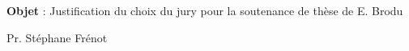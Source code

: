 \documentclass[11pt]{letter}
\begin{document}
\begin{letter}{\textbf{Objet} : Justification du choix du jury pour la soutenance de thèse de E. Brodu}
\parbox{\linewidth}{\hfill Pr. Stéphane Frénot}


\end{letter}
\end{document}
